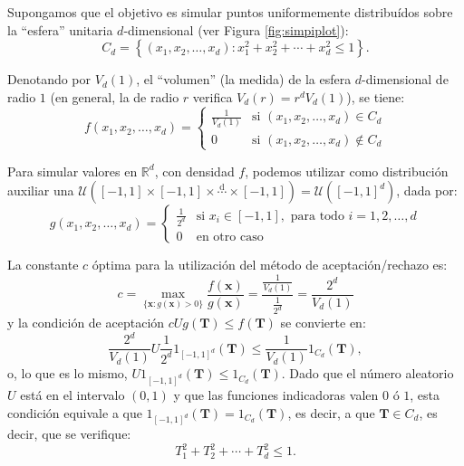 \documentclass[
]{book}
\theoremstyle{break}
\theoremstyle{definition}
\theoremstyle{definition}
\theoremstyle{definition}
\theoremstyle{remark}
\begin{document}
Supongamos que el objetivo es simular puntos uniformemente distribuídos sobre la ``esfera'' unitaria \(d\)-dimensional (ver Figura \ref{fig:simpiplot}):
\[C_d=\left\{  \left( x_1, x_2, \ldots, x_d \right) 
: x_1^2 + x_2^2 + \cdots + x_d^2 \leq1 \right\}.\]

Denotando por \(V_d\left( 1\right)\), el ``volumen'' (la medida) de la
esfera \(d\)-dimensional de radio \(1\) (en general, la de radio \(r\)
verifica \(V_d\left( r\right) =r^{d}V_d\left( 1\right)\)), se tiene:
\[f\left( x_1,x_2,\ldots,x_d\right)  =\left\{
\begin{array}{ll}
\frac{1}{V_d\left( 1\right)  } & \text{si } \left( x_1, x_2, \ldots
,x_d\right)  \in C_d\\
0 & \text{si } \left( x_1,x_2,\ldots,x_d\right)  \notin C_d
\end{array} \right.\]

Para simular valores en \(\mathbb{R}^{d}\), con densidad \(f\),
podemos utilizar como distribución auxiliar una
\(\mathcal{U}\left( \left[ -1,1\right] \times\left[ -1,1\right] \times\overset{\text{d}}{\cdots}\times\left[ -1,1\right] \right) = \mathcal{U}\left( \left[ -1,1\right]^{d}\right)\), dada por:
\[g\left( x_1,x_2,\ldots,x_d\right)  =\left\{
\begin{array}{ll}
\frac{1}{2^{d}} & \text{si } x_i\in\left[  -1,1\right], \text{ para todo }
i=1,2,\ldots,d\\
0 &  \text{en otro caso}
\end{array}\right.\]

La constante \(c\) óptima para la utilización del método de
aceptación/rechazo es:
\[c=\max_{\{\mathbf{x}:g\left( \mathbf{x}\right) > 0\}}
\frac{f\left( \mathbf{x}\right)  }{g\left( \mathbf{x}\right)  }
=\frac{\frac{1}{V_d\left( 1\right)  }}{\frac{1}{2^{d}}}
=\frac{2^{d}}{V_d\left( 1\right)}\]
y la condición de aceptación \(cUg\left( \mathbf{T}\right) \leq f\left( \mathbf{T}\right)\) se convierte en:
\[\frac{2^{d}}{V_d\left( 1\right)  }U\frac{1}{2^{d}}1_{\left[  -1,1\right]
^{d}}\left( \mathbf{T}\right)  \leq\frac{1}{V_d\left( 1\right)
}1_{C_d}\left( \mathbf{T}\right),\]
o, lo que es lo mismo, \(U1_{\left[ -1,1\right]^{d}}\left( \mathbf {T}\right) \leq1_{C_d}\left( \mathbf{T}\right)\).
Dado que el número aleatorio \(U\) está en el intervalo \((0,1)\) y que las funciones
indicadoras valen \(0\) ó \(1\), esta condición equivale a que \(1_{\left[ -1,1\right] ^{d}}\left( \mathbf{T}\right) =1_{C_d}\left( \mathbf{T}\right)\), es decir, a que
\(\mathbf{T}\in C_d\), es decir, que se verifique:
\[T_1^2+T_2^2+\cdots+T_d^2\leq1.\]
\end{document}
